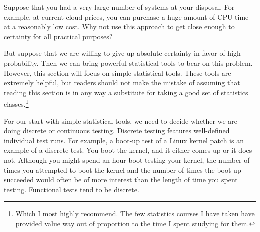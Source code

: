 \QuickQuiz{}
	Suppose that you had a very large number of systems at your
	disposal.
	For example, at current cloud prices, you can purchase a
	huge amount of CPU time at a reasonably low cost.
	Why not use this approach to get close enough to certainty
	for all practical purposes?
 \QuickQuizEnd

But suppose that we are willing to give up absolute certainty in favor
of high probability.
Then we can bring powerful statistical tools to bear on this problem.
However, this section will focus on simple statistical tools.
These tools are extremely helpful, but readers should not make the
mistake of assuming that reading this section is in any way a substitute
for taking a good set of statistics classes.\footnote{
	Which I most highly recommend.
	The few statistics courses I have taken have provided value
	way out of proportion to the time I spent studying for them.}

For our start with simple statistical tools, we need to decide whether
we are doing discrete or continuous testing.
Discrete testing features well-defined individual test runs.
For example, a boot-up test of a Linux kernel patch is an example
of a discrete test.
You boot the kernel, and it either comes up or it does not.
Although you might spend an hour boot-testing your kernel, the number of
times you attempted to boot the kernel and the number of times the
boot-up succeeded would often be of more interest than the length
of time you spent testing.
Functional tests tend to be discrete.

